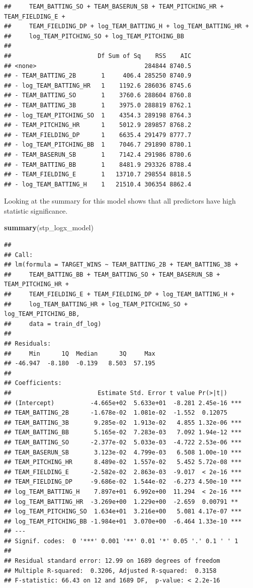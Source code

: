 \documentclass[
]{article}
\newenvironment{Shaded}{\begin{snugshade}}{\end{snugshade}}
\newcommand{\FunctionTok}[1]{\textcolor[rgb]{0.13,0.29,0.53}{\textbf{#1}}}
\newcommand{\NormalTok}[1]{#1}
\begin{document}
\begin{verbatim}
##     TEAM_BATTING_SO + TEAM_BASERUN_SB + TEAM_PITCHING_HR + TEAM_FIELDING_E + 
##     TEAM_FIELDING_DP + log_TEAM_BATTING_H + log_TEAM_BATTING_HR + 
##     log_TEAM_PITCHING_SO + log_TEAM_PITCHING_BB
## 
##                        Df Sum of Sq    RSS    AIC
## <none>                              284844 8740.5
## - TEAM_BATTING_2B       1     406.4 285250 8740.9
## - log_TEAM_BATTING_HR   1    1192.6 286036 8745.6
## - TEAM_BATTING_SO       1    3760.6 288604 8760.8
## - TEAM_BATTING_3B       1    3975.0 288819 8762.1
## - log_TEAM_PITCHING_SO  1    4354.3 289198 8764.3
## - TEAM_PITCHING_HR      1    5012.9 289857 8768.2
## - TEAM_FIELDING_DP      1    6635.4 291479 8777.7
## - log_TEAM_PITCHING_BB  1    7046.7 291890 8780.1
## - TEAM_BASERUN_SB       1    7142.4 291986 8780.6
## - TEAM_BATTING_BB       1    8481.9 293326 8788.4
## - TEAM_FIELDING_E       1   13710.7 298554 8818.5
## - log_TEAM_BATTING_H    1   21510.4 306354 8862.4
\end{verbatim}

Looking at the summary for this model shows that all predictors have
high statistic significance.

\begin{Shaded}
\begin{Highlighting}[]
\FunctionTok{summary}\NormalTok{(stp\_logx\_model)}
\end{Highlighting}
\end{Shaded}

\begin{verbatim}
## 
## Call:
## lm(formula = TARGET_WINS ~ TEAM_BATTING_2B + TEAM_BATTING_3B + 
##     TEAM_BATTING_BB + TEAM_BATTING_SO + TEAM_BASERUN_SB + TEAM_PITCHING_HR + 
##     TEAM_FIELDING_E + TEAM_FIELDING_DP + log_TEAM_BATTING_H + 
##     log_TEAM_BATTING_HR + log_TEAM_PITCHING_SO + log_TEAM_PITCHING_BB, 
##     data = train_df_log)
## 
## Residuals:
##     Min      1Q  Median      3Q     Max 
## -46.947  -8.180  -0.139   8.503  57.195 
## 
## Coefficients:
##                        Estimate Std. Error t value Pr(>|t|)    
## (Intercept)          -4.665e+02  5.633e+01  -8.281 2.45e-16 ***
## TEAM_BATTING_2B      -1.678e-02  1.081e-02  -1.552  0.12075    
## TEAM_BATTING_3B       9.285e-02  1.913e-02   4.855 1.32e-06 ***
## TEAM_BATTING_BB       5.165e-02  7.283e-03   7.092 1.94e-12 ***
## TEAM_BATTING_SO      -2.377e-02  5.033e-03  -4.722 2.53e-06 ***
## TEAM_BASERUN_SB       3.123e-02  4.799e-03   6.508 1.00e-10 ***
## TEAM_PITCHING_HR      8.489e-02  1.557e-02   5.452 5.72e-08 ***
## TEAM_FIELDING_E      -2.582e-02  2.863e-03  -9.017  < 2e-16 ***
## TEAM_FIELDING_DP     -9.686e-02  1.544e-02  -6.273 4.50e-10 ***
## log_TEAM_BATTING_H    7.897e+01  6.992e+00  11.294  < 2e-16 ***
## log_TEAM_BATTING_HR  -3.269e+00  1.229e+00  -2.659  0.00791 ** 
## log_TEAM_PITCHING_SO  1.634e+01  3.216e+00   5.081 4.17e-07 ***
## log_TEAM_PITCHING_BB -1.984e+01  3.070e+00  -6.464 1.33e-10 ***
## ---
## Signif. codes:  0 '***' 0.001 '**' 0.01 '*' 0.05 '.' 0.1 ' ' 1
## 
## Residual standard error: 12.99 on 1689 degrees of freedom
## Multiple R-squared:  0.3206, Adjusted R-squared:  0.3158 
## F-statistic: 66.43 on 12 and 1689 DF,  p-value: < 2.2e-16
\end{verbatim}
\end{document}
